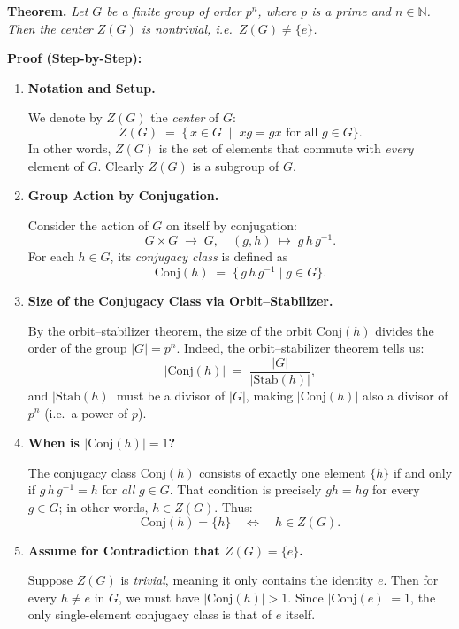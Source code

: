 \documentclass[12pt]{article}
\theoremstyle{definition} %
\theoremstyle{plain} %
\begin{document}
\noindent
\textbf{Theorem.} 
\emph{Let $G$ be a finite group of order $p^n$, where $p$ is a prime and $n\in \mathbb{N}$. Then the center $Z(G)$ is nontrivial, i.e.\ $Z(G) \neq \{e\}$.}

\bigskip

\noindent
\textbf{Proof (Step-by-Step):}

\begin{enumerate}
  \item \textbf{Notation and Setup.}

  We denote by $Z(G)$ the \emph{center} of $G$:
  \[
    Z(G) \;=\; \{\, x \in G \;\mid\; xg = gx \text{ for all } g \in G\}.
  \]
  In other words, $Z(G)$ is the set of elements that commute with \emph{every} element of $G$. Clearly $Z(G)$ is a subgroup of $G$.  

  \item \textbf{Group Action by Conjugation.}

  Consider the action of $G$ on itself by conjugation:
  \[
    G \times G \;\longrightarrow\; G,
    \quad (g,h) \;\mapsto\; g\,h\,g^{-1}.
  \]
  For each $h \in G$, its \emph{conjugacy class} is defined as
  \[
    \mathrm{Conj}(h) \;=\; \{\,g\,h\,g^{-1} \;|\; g \in G\}.
  \]

  \item \textbf{Size of the Conjugacy Class via Orbit--Stabilizer.}

  By the orbit--stabilizer theorem, the size of the orbit $\mathrm{Conj}(h)$ divides the order of the group $|G| = p^n$. Indeed, the orbit--stabilizer theorem tells us:
  \[
    |\mathrm{Conj}(h)| \;=\; \frac{|G|}{|\mathrm{Stab}(h)|},
  \]
  and $|\mathrm{Stab}(h)|$ must be a divisor of $|G|$, making $|\mathrm{Conj}(h)|$ also a divisor of $p^n$ (i.e.\ a power of $p$).

  \item \textbf{When is $|\mathrm{Conj}(h)| = 1$?}

  The conjugacy class $\mathrm{Conj}(h)$ consists of exactly one element $\{h\}$ if and only if $g\,h\,g^{-1} = h$ for \emph{all} $g \in G$.  That condition is precisely $gh = hg$ for every $g \in G$; in other words, $h \in Z(G)$.  
  Thus:
  \[
    \mathrm{Conj}(h) = \{h\}
    \quad\Longleftrightarrow\quad
    h \in Z(G).
  \]

  \item \textbf{Assume for Contradiction that $Z(G)=\{e\}$.}

  Suppose $Z(G)$ is \emph{trivial}, meaning it only contains the identity $e$.  Then for every $h \neq e$ in $G$, we must have $|\mathrm{Conj}(h)| > 1$.  Since $|\mathrm{Conj}(e)| = 1$, the only single-element conjugacy class is that of $e$ itself.


\end{enumerate}
\end{document}
